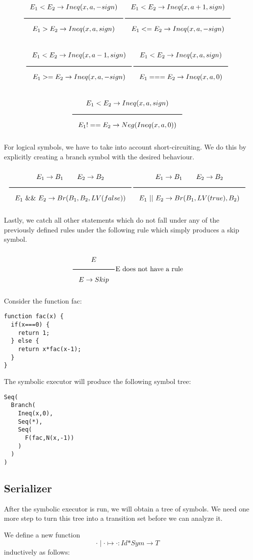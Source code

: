 \[
\Rule{E_1 < E_2 \eval Ineq(x,a,-sign)}
      {E_1 > E_2 \eval Ineq(x,a,sign)} \hfill
\Rule{E_1 < E_2 \eval Ineq(x,a+1,sign)}
      {E_1 <= E_2 \eval Ineq(x,a,-sign)}
\]

\[
\Rule{E_1 < E_2 \eval Ineq(x,a-1,sign)}
     {E_1 >= E_2 \eval Ineq(x,a,-sign)} \hfill
\Rule{E_1 < E_2 \eval Ineq(x,a,sign)}
     {E_1 === E_2 \eval Ineq(x,a,0)} \hfill
\]

\[      
\Rule{E_1 < E_2 \eval Ineq(x,a,sign)}
     {E_1 !== E_2 \eval Neg(Ineq(x,a,0))}
\]

\noindent
For logical symbols, we have to take into account short-circuiting. We do this by explicitly creating a branch symbol with the desired behaviour.

\[    
\Rule{E_1 \eval B_1 \qquad E_2 \eval B_2}
      {E_1\ \&\&\ E_2 \eval Br(B_1,B_2,LV(false))} \hfill
\Rule{E_1 \eval B_1 \qquad E_2 \eval B_2}
      {E_1\ ||\ E_2 \eval Br(B_1,LV(true),B_2)}
\]

\noindent
Lastly, we catch all other statements which do not fall under any of the previously defined rules under the following rule which simply produces a skip symbol.

\[
\Rule{E}
     {E \eval Skip}
\text{E does not have a rule}
\]

\begin{example}
  Consider the function fac:
\begin{lstlisting}
function fac(x) {
  if(x===0) {
    return 1;
  } else {
    return x*fac(x-1);
  }
}
\end{lstlisting}

\noindent
The symbolic executor will produce the following symbol tree:
\begin{lstlisting}
Seq(
  Branch(
    Ineq(x,0),
    Seq(*),
    Seq(
      F(fac,N(x,-1))
    )
  )
)
\end{lstlisting}

\end{example}



\subsection{Serializer}
After the symbolic executor is run, we will obtain a tree of symbols. 
We need one more step to turn this tree into a transition set before we can analyze it.

\noindent
We define a new function
\[
\cdot \mid \cdot \mapsto \cdot: Id\boldsymbol{*} Sym\to T
\]
inductively as follows:

